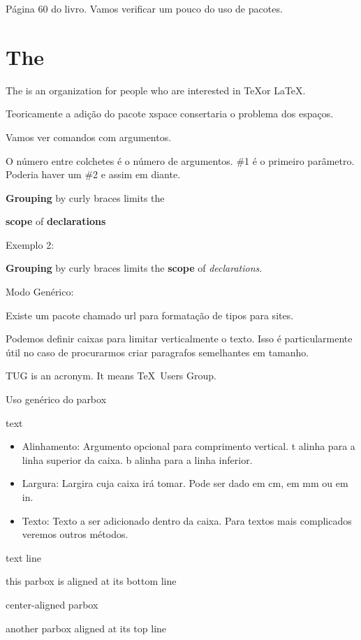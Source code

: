 \documentclass{article}
\begin{document}
Página 60 do livro.
Vamos verificar um pouco do uso de pacotes.

\section{The \TUG}

The \TUG is an organization for people
who are interested in \TeX or \LaTeX.

Teoricamente a adição do pacote xspace consertaria o problema dos espaços.

Vamos ver comandos com argumentos.

\newcommand{\keyword}[1]{\textbf{#1}}

O número entre colchetes é o número de argumentos.
\#1 é o primeiro parâmetro. Poderia haver um \#2 e assim
em diante.


\keyword{Grouping} by curly braces limits the

\keyword{scope} of \keyword{declarations}

Exemplo 2:

\renewcommand{\keyword}[2][\bfseries]{{#1#2}}
\keyword{Grouping} by curly braces limits the
\keyword{scope} of \keyword[\itshape]{declarations}.

Modo Genérico:

Existe um pacote chamado url para formatação de tipos para sites.

Podemos definir caixas para limitar verticalmente o texto.
Isso é particularmente útil no caso de procurarmos criar paragrafos semelhantes em tamanho.

\parbox{3cm}{TUG is an acronym. It means \TeX\ Users Group.}

Uso genérico do parbox \parbox[alignment]{width}{text}
\begin{itemize}
        \item Alinhamento: Argumento opcional para comprimento vertical.
        t alinha para a linha superior da caixa.
        b alinha para a linha inferior.
        \item Largura: Largira cuja caixa irá tomar. Pode ser dado em cm, em mm ou em in.
        \item Texto: Texto a ser adicionado dentro da caixa.
        Para textos mais complicados veremos outros métodos.
\end{itemize}

text line
\quad\parbox[b]{1.8cm}{this parbox is aligned at its bottom line}
\quad\parbox{1.5cm}{center-aligned parbox}
\quad\parbox[t]{2cm}{another parbox aligned at its top line}
\end{document}
